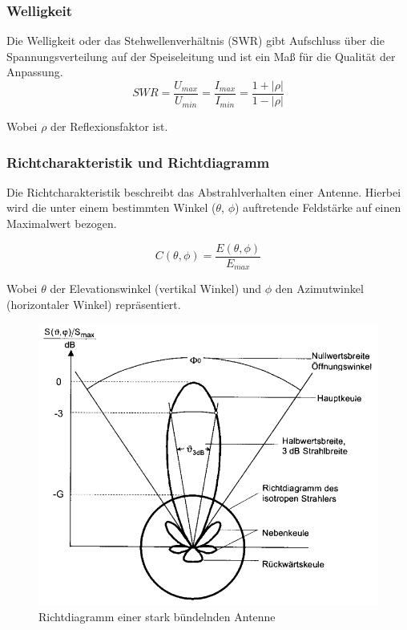 \documentclass[12pt]{scrreprt}
\begin{document}
	\subsubsection{Welligkeit}
	Die Welligkeit oder das Stehwellenverhältnis (SWR) gibt Aufschluss über die Spannungsverteilung auf der Speiseleitung und ist ein Maß für die Qualität der Anpassung.\\
	
	
	\begin{equation}
		SWR=\frac{U_{max}}{U_{min}}=\frac{I_{max}}{I_{min}}=\frac{1+\lvert \rho \lvert}{1-\lvert \rho \lvert}
	\end{equation}
	
	Wobei $\rho$ der Reflexionsfaktor ist. 
	
	\subsubsection{Richtcharakteristik und Richtdiagramm}
	Die Richtcharakteristik beschreibt das Abstrahlverhalten einer Antenne. Hierbei wird die unter einem bestimmten Winkel ($\theta$, $\phi$) auftretende Feldstärke auf einen Maximalwert bezogen.
	
	\begin{equation}
		C(\theta, \phi)=\frac{E(\theta, \phi)}{E_{max}}
	\end{equation}
	
	Wobei $\theta$ der Elevationswinkel (vertikal Winkel) und $\phi$ den Azimutwinkel (horizontaler Winkel) repräsentiert.
	
	\begin{figure}[h]
		\centering
		\includegraphics[width=16cm]{../ref/Richtdiagramm_Beispiel}
		\caption{Richtdiagramm einer stark bündelnden Antenne}
		\label{fig:Richtdiagramm Beispiel}
	\end{figure}
	
\end{document}
